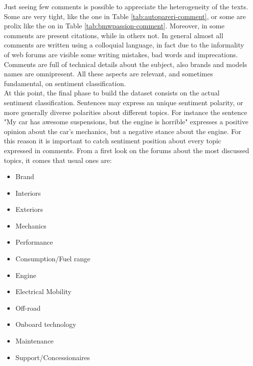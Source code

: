 Just seeing few comments is possible to appreciate the heterogeneity of the texts. Some are very tight, like the one in Table \ref{tab:autopareri-comment}, or some are prolix like the on in Table \ref{tab:bmwpassion-comment}. Moreover, in some comments are present citations, while in others not. In general almost all comments are written using a colloquial language, in fact due to the informality of web forums are visible some writing mistakes, bad words and imprecations. Comments are full of technical details about the subject, also brands and models names are omnipresent. All these aspects are relevant, and sometimes fundamental, on sentiment classification.\\

At this point, the final phase to build the dataset consists on the actual sentiment classification. Sentences may express an unique sentiment polarity, or more generally diverse polarities about different topics. For instance the sentence "My car has awesome suspensions, but the engine is horrible" expresses a positive opinion about the car's mechanics, but a negative stance about the engine. For this reason it is important to catch sentiment position about every topic expressed in comments. From a first look on the forums about the most discussed topics, it comes that usual ones are:

\begin{itemize}
	\item Brand
	\item Interiors
	\item Exteriors
	\item Mechanics
	\item Performance
	\item Consumption/Fuel range
	\item Engine
	\item Electrical Mobility
	\item Off-road
	\item Onboard technology
	\item Maintenance
	\item Support/Concessionaires
\end{itemize}

